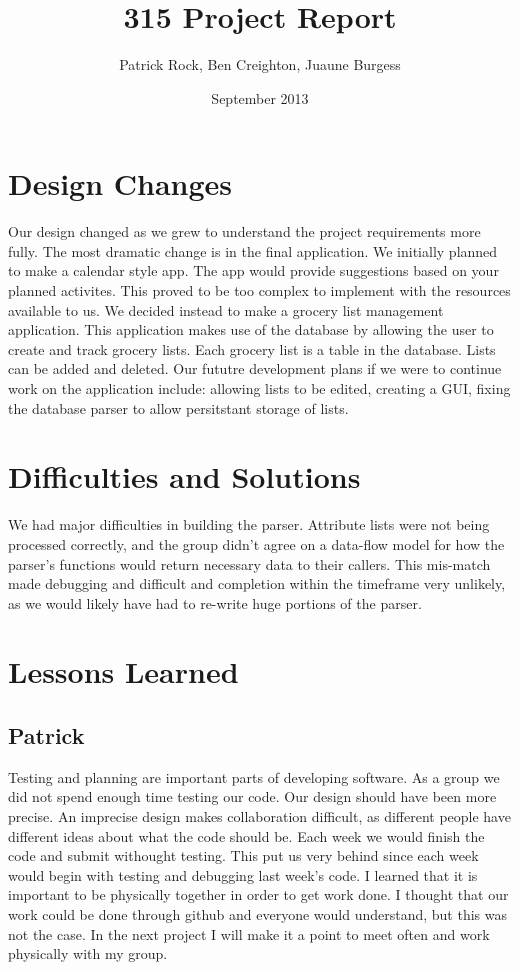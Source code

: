 \documentclass{article}
\title{315 Project Report}
\author{Patrick Rock, Ben Creighton, Juaune Burgess}
\date{September 2013}
\begin{document}
\maketitle

\section{Design Changes}
Our design changed as we grew to understand the project requirements more fully. The most dramatic change 
is in the final application. We initially planned to make a calendar style app. The app would provide suggestions
based on your planned activites. This proved to be too complex to implement with the resources available to us. 
We decided instead to make a grocery list management application. This application makes use of the database by 
allowing the user to create and track grocery lists. Each grocery list is a table in the database. Lists can 
be added and deleted. Our fututre development plans if we were to continue work on the application include:
allowing lists to be edited, creating a GUI, fixing the database parser to allow persitstant storage of lists. 

\section{Difficulties and Solutions}
We had major difficulties in building the parser.
Attribute lists were not being processed correctly, and the group didn’t agree on a data-flow model for how the
parser's functions would return necessary data to their callers. This mis-match made debugging and difficult and
completion within the timeframe very unlikely, as we would likely have had to re-write huge portions of the parser.

\section{Lessons Learned}
\subsection{Patrick} Testing and planning are important parts of developing software. As a group we did not spend enough
time testing our code. Our design should have been more precise. An imprecise design makes collaboration
difficult, as different people have different ideas about what the code should be. Each week we would 
finish the code and submit withought testing. This put us very behind since each week would begin with testing
and debugging last week's code. I learned that it is important to be physically together in order to get work 
done. I thought that our work could be done through github and everyone would understand, but this was not the case.
In the next project I will make it a point to meet often and work physically with my group.
\end{document}
